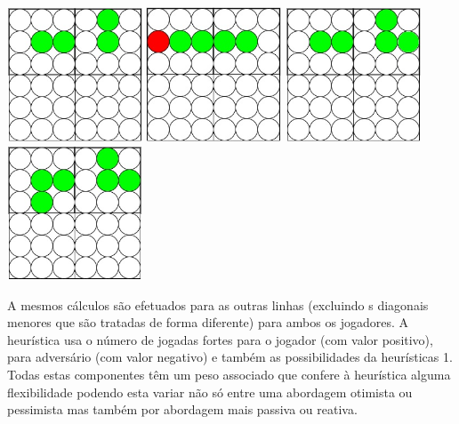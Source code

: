 \begin{table}[H]
\centering
\includegraphics[height=4cm]{images/h12_ex1.jpg}
\includegraphics[height=4cm]{images/h12_ex2.jpg}
\includegraphics[height=4cm]{images/h12_ex3.jpg}
\includegraphics[height=4cm]{images/h12_ex4.jpg}
\end{table}

A mesmos cálculos são efetuados para as outras linhas (excluindo s diagonais menores que são tratadas de forma diferente) para ambos os jogadores. A heurística usa o número de jogadas fortes para o jogador (com valor positivo), para adversário (com valor negativo) e também as possibilidades da heurísticas 1. Todas estas componentes têm um peso associado que confere à heurística alguma flexibilidade podendo esta variar não só entre uma abordagem otimista ou pessimista mas também por abordagem mais passiva ou reativa.

